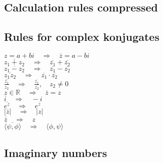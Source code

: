 \documentclass[a4paper,7pt,fleqn]{article}
\begin{document}
\begin{multicols}{3}
\begin{minipage}{\linewidth}
\end{minipage}











\newpage
\section{Calculation rules compressed}


\begin{minipage}{\linewidth}
\subsection{Rules for complex konjugates}

\( z = a + bi \quad \Rightarrow \quad \overline{z} = a - bi \)\\
\( \overline{z_1 + z_2} \quad \Rightarrow \quad \overline{z_1} + \overline{z_2} \)\\
\( \overline{z_1 - z_2} \quad \Rightarrow \quad \overline{z_1} - \overline{z_2} \)\\
\( \overline{z_1 z_2} \quad \Rightarrow \quad \overline{z_1} \cdot \overline{z_2} \)\\
\( \overline{\frac{z_1}{z_2}} \quad \Rightarrow \quad \frac{\overline{z_1}}{\overline{z_2}}, \quad z_2 \neq 0 \)\\
\( z \in \mathbb{R} \quad \Rightarrow \quad \overline{z} = z \)\\
\( \overline{i} \quad \Rightarrow \quad -i \)\\
\( \overline{e^z} \quad \Rightarrow \quad e^{\overline{z}} \)\\
\( |\overline{z}| \quad \Rightarrow \quad |z| \)\\
\( \overline{\overline{z}} \quad \Rightarrow \quad z \)\\
\( \overline{\langle \psi, \phi \rangle} \quad \Rightarrow \quad \langle \phi, \psi \rangle \)\\


\end{minipage}
\begin{minipage}{\linewidth}

\subsection{Imaginary numbers}


\end{minipage}
\end{multicols}
\end{document}
